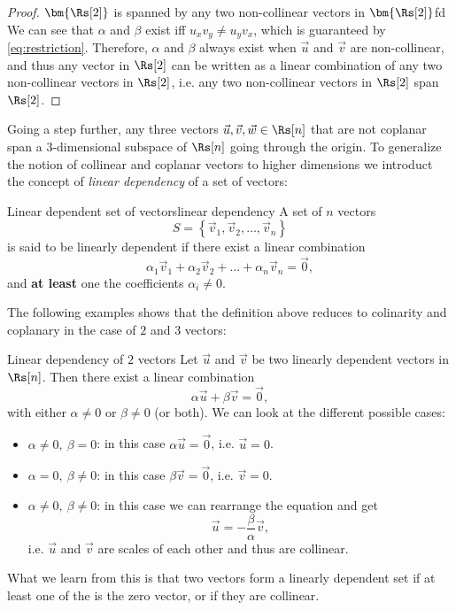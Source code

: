 \begin{proof}{$\bm{\Rs[2]}$ is spanned by any two non-collinear vectors in $\bm{\Rs[2]}$}{fd}
	We can see that $\alpha$ and $\beta$ exist iff $u_{x}v_{y}\neq u_{y}v_{x}$, which is guaranteed by \autoref{eq:restriction}. Therefore, $\alpha$ and $\beta$ always exist when $\vec{u}$ and $\vec{v}$ are non-collinear, and thus any vector in $\Rs[2]$ can be written as a linear combination of any two non-collinear vectors in $\Rs[2]$, i.e. any two non-collinear vectors in $\Rs[2]$ span $\Rs[2]$.
\end{proof}

Going a step further, any three vectors $\vec{u},\vec{v},\vec{w}\in\Rs[n]$ that are not coplanar span a 3-dimensional subspace of $\Rs[n]$ going through the origin. To generalize the notion of collinear and coplanar vectors to higher dimensions we introduct the concept of \emph{linear dependency} of a set of vectors:

\begin{definition}{Linear dependent set of vectors}{linear dependency}
	A set of $n$ vectors
	\begin{equation}
		S = \left\{ \vec{v}_{1}, \vec{v}_{2}, \dots, \vec{v}_{n} \right\}
		\label{eq:set of n vectors}
	\end{equation}
	is said to be linearly dependent if there exist a linear combination
	\begin{equation}
		\alpha_{1}\vec{v}_{1} + \alpha_{2}\vec{v}_{2} + \dots + \alpha_{n}\vec{v}_{n} = \vec{0},
		\label{eq:set of n vectors}
	\end{equation}
	and \textbf{at least} one the coefficients $\alpha_{i}\neq0$.
\end{definition}

The following examples shows that the definition above reduces to colinarity and coplanary in the case of $2$ and $3$ vectors:
\begin{example}{Linear dependency of $2$ vectors}{}
	Let $\vec{u}$ and $\vec{v}$ be two linearly dependent vectors in $\Rs[n]$. Then there exist a linear combination
	\[
		\alpha\vec{u} + \beta\vec{v} = \vec{0},
	\]
	with either $\alpha\neq0$ or $\beta\neq0$ (or both). We can look at the different possible cases:
	\begin{itemize}
		\item $\alpha\neq0,\ \beta=0$: in this case $\alpha\vec{u}=\vec{0}$, i.e. $\vec{u}=0$.
		\item $\alpha=0,\ \beta\neq0$: in this case $\beta\vec{v}=\vec{0}$, i.e. $\vec{v}=0$.
		\item $\alpha\neq0,\ \beta\neq0$: in this case we can rearrange the equation and get
			\[
				\vec{u} = -\frac{\beta}{\alpha}\vec{v},
			\]
			i.e. $\vec{u}$ and $\vec{v}$ are scales of each other and thus are collinear.
	\end{itemize}
	What we learn from this is that two vectors form a linearly dependent set if at least one of the is the zero vector, or if they are collinear.

\end{example}

